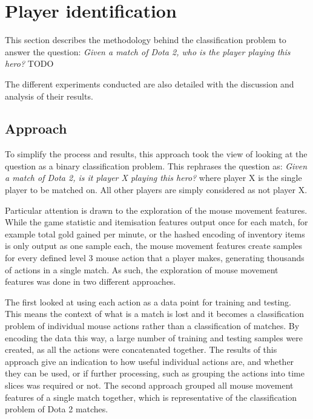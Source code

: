 \documentclass[Report.tex]{subfiles}
\begin{document}
\section{Player identification}\label{sec:game-classification}
This section describes the methodology behind the classification problem to answer the question: \textit{Given a match of Dota 2, who is the player playing this hero?} TODO 

The different experiments conducted are also detailed with the discussion and analysis of their results. 



\subsection{Approach}\label{sec:game-approach}
To simplify the process and results, this approach took the view of looking at the question as a binary classification problem. This rephrases the question as: \textit{Given a match of Dota 2, is it player X playing this hero?} where player X is the single player to be matched on. All other players are simply considered as not player X. 

Particular attention is drawn to the exploration of the mouse movement features. While the game statistic and itemisation features output once for each match, for example total gold gained per minute, or the hashed encoding of inventory items is only output as one sample each, the mouse movement features create samples for every defined level 3 mouse action that a player makes, generating thousands of actions in a single match. As such, the exploration of mouse movement features was done in two different approaches. 

The first looked at using each action as a data point for training and testing. This means the context of what is a match is lost and it becomes a classification problem of individual mouse actions rather than a classification of matches. By encoding the data this way, a large number of training and testing samples were created, as all the actions were concatenated together. The results of this approach give an indication to how useful individual actions are, and whether they can be used, or if further processing, such as grouping the actions into time slices was required or not. The second approach grouped all mouse movement features of a single match together, which is representative of the classification problem of Dota 2 matches. 

\end{document}
